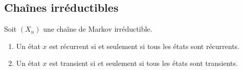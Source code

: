 \subsection{Chaînes irréductibles}

\begin{proposition}     \label{Proptoustanstousrecirrsi}
    Soit \( (X_n)\) une chaîne de Markov irréductible.
    \begin{enumerate}
        \item
            Un état \( x\) est récurrent si et seulement si tous les états sont récurrents.
        \item
            Un état \( x\) est transient si et seulement si tous les états sont transients.
    \end{enumerate}
\end{proposition}

